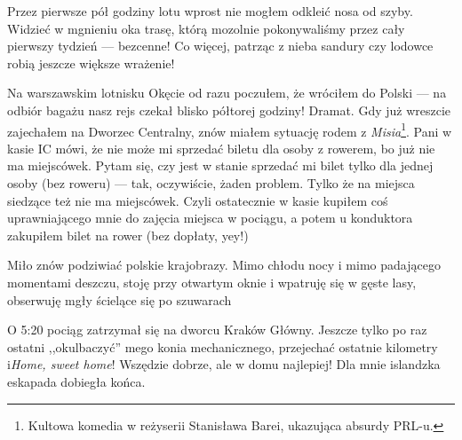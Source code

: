 
Przez pierwsze pół godziny lotu wprost nie mogłem odkleić nosa od szyby. Widzieć w mgnieniu oka trasę, którą mozolnie pokonywaliśmy przez cały pierwszy tydzień --- bezcenne! Co więcej, patrząc z nieba sandury czy lodowce robią jeszcze większe wrażenie!

Na warszawskim lotnisku Okęcie od razu poczułem, że wróciłem do Polski --- na odbiór bagażu nasz rejs czekał blisko półtorej godziny! Dramat. Gdy już wreszcie zajechałem na Dworzec Centralny, znów miałem sytuację rodem z \emph{Misia}\footnote{Kultowa komedia w reżyserii Stanisława Barei, ukazująca absurdy PRL-u.}. Pani w kasie IC mówi, że nie może mi sprzedać biletu dla osoby z rowerem, bo już nie ma miejscówek. Pytam się, czy jest w stanie sprzedać mi bilet tylko dla jednej osoby (bez roweru) --- tak, oczywiście, żaden problem. Tylko że na miejsca siedzące też nie ma miejscówek. Czyli ostatecznie w kasie kupiłem coś uprawniającego mnie do zajęcia miejsca w pociągu, a potem u konduktora zakupiłem bilet na rower (bez dopłaty, yey!)

Miło znów podziwiać polskie krajobrazy. Mimo chłodu nocy i mimo padającego momentami deszczu, stoję przy otwartym oknie i wpatruję się w gęste lasy, obserwuję mgły ścielące się po szuwarach\textellipsis

O 5:20 pociąg zatrzymał się na dworcu Kraków Główny. Jeszcze tylko po raz ostatni ,,okulbaczyć'' mego konia mechanicznego, przejechać ostatnie kilometry i\textellipsis \emph{Home, sweet home}! Wszędzie dobrze, ale w domu najlepiej! Dla mnie islandzka eskapada dobiegła końca.

